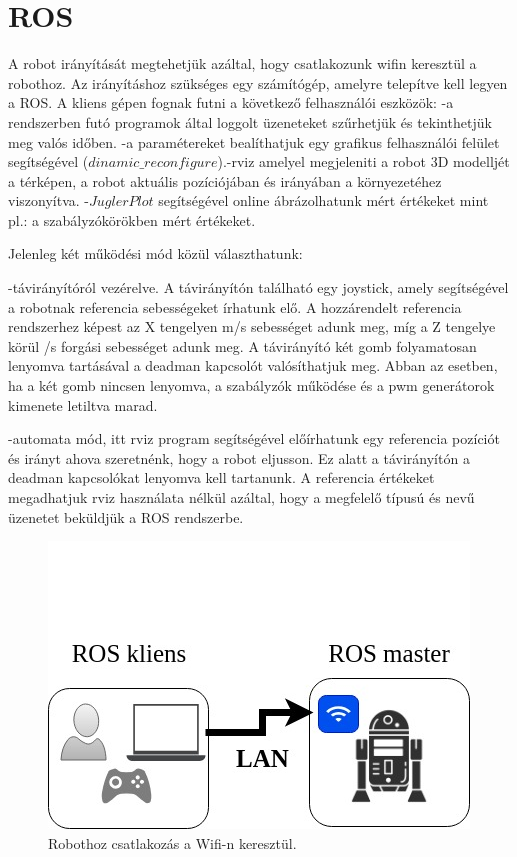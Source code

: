
\section{ROS}

A robot irányítását megtehetjük azáltal, hogy csatlakozunk wifin keresztül a robothoz. Az irányításhoz szükséges egy számítógép, amelyre telepítve kell  legyen a ROS. A kliens gépen fognak futni a következő felhasználói eszközök:
-a rendszerben futó programok által loggolt üzeneteket szűrhetjük és tekinthetjük meg valós időben.
-a paramétereket bealíthatjuk egy grafikus felhasználói felület segítségével ($dinamic\_reconfigure$).-rviz amelyel megjeleniti a robot 3D modelljét a térképen, a robot aktuális pozíciójában és irányában a környezetéhez viszonyítva.
-$JuglerPlot$ segítségével online ábrázolhatunk mért értékeket mint pl.: a szabályzókörökben mért értékeket.

Jelenleg két működési mód közül választhatunk:

	-távirányítóról vezérelve. A távirányítón található egy joystick, amely segítségével a robotnak referencia sebességeket írhatunk elő. A hozzárendelt referencia rendszerhez képest az X tengelyen m/s sebességet adunk meg, míg a Z tengelye körül \degree/s forgási sebességet adunk meg.
A távirányító két gomb folyamatosan lenyomva tartásával a deadman kapcsolót valósíthatjuk meg. Abban az esetben, ha a két gomb nincsen lenyomva, a szabályzók működése és a pwm generátorok kimenete letiltva marad.

	-automata mód, itt rviz program segítségével előírhatunk egy referencia pozíciót és irányt ahova szeretnénk, hogy a robot eljusson. Ez alatt a távirányítón a deadman kapcsolókat lenyomva kell tartanunk. A referencia értékeket megadhatjuk rviz használata nélkül azáltal, hogy a megfelelő típusú és nevű üzenetet beküldjük a ROS rendszerbe.



\begin{figure}[H]
  \includegraphics{tikz/RobotUserLan.jpg}
  \caption{Robothoz csatlakozás a Wifi-n keresztül.}
  \label{fig:RobotUserLan}
\end{figure}


